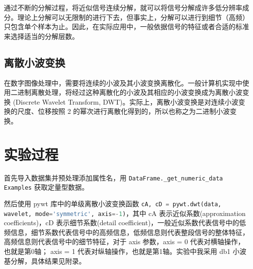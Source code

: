 \documentclass[12pt,AutoFakeBold]{article}
\begin{document}
通过不断的分解过程，将近似信号连续分解，就可以将信号分解成许多低分辨率成分。理论上分解可以无限制的进行下去，但事实上，分解可以进行到细节（高频）只包含单个样本为止。因此，在实际应用中，一般依据信号的特征或者合适的标准来选择适当的分解层数。

\subsection{离散小波变换}

在数字图像处理中，需要将连续的小波及其小波变换离散化。一般计算机实现中使用二进制离散处理，将经过这种离散化的小波及其相应的小波变换成为离散小波变换 (Discrete Wavelet Transform, DWT)。实际上，离散小波变换是对连续小波变换的尺度、位移按照 2 的幂次进行离散化得到的，所以也称之为二进制小波变换。

\section{实验过程}

首先导入数据集并预处理添加属性名，用 \lstinline[language=Python]|DataFrame._get_numeric_data Examples| 获取定量型数据。

然后使用 pywt 库中的单级离散小波变换函数 \lstinline[language=Python]|cA, cD = pywt.dwt(data, wavelet, mode='symmetric', axis=-1)|，其中 cA 表示近似系数(approximation coefficients)，cD 表示细节系数(detail coefficient)，一般近似系数代表信号中的低频信息，细节系数代表信号中的高频信息，低频信息则代表整段信号的整体特征，高频信息则代表信号中的细节特征，对于 axis 参数，axis = 0 代表对横轴操作，也就是第0轴；
axis = 1 代表对纵轴操作，也就是第1轴。实验中我采用 db1 小波基分解，具体结果见附录。 



\end{document}

